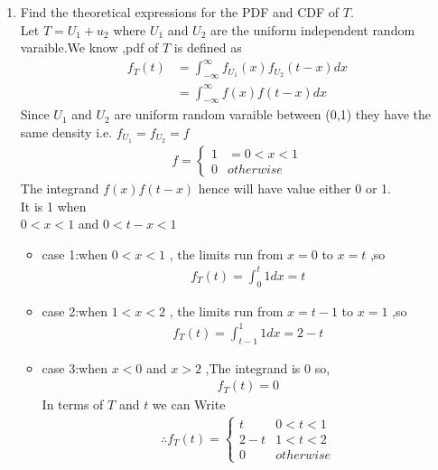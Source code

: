 \documentclass[journal,12pt,twocolumn]{IEEEtran}
\renewcommand\thesection{\arabic{section}}
\begin{document}
\begin{enumerate}[label=\thesection.\arabic*
,ref=\thesection.\theenumi]
\begin{figure}[h]
    \centering
    \texttt{[image: T\_Pdf.png]}
    \caption{The PDF of $T$}
    \label{fig:T_Pdf}
\end{figure}
\item Find the theoretical expressions for the PDF and CDF of $T$.\\
\solution Let $T = U_1 + u_2$ where $U_1$ and $U_2$ are the uniform independent random varaible.We know ,pdf of $T$ is defined as 
\begin{align}
    f_T(t) &= \int_{-\infty}^{\infty}f_{U_1}(x)f_{U_2}(t-x)dx\\
    &=\int_{-\infty}^{\infty}f(x)f(t-x)dx
\end{align}
Since $U_1$ and $U_2$ are uniform random varaible between (0,1) they have the same density
i.e. $f_{U_1} = f_{U_2} = f$
\begin{align}
    f = \begin{cases}
        1 &= 0<x<1 \\
        0 & otherwise
    \end{cases}
\end{align}
The integrand $f(x)f(t-x)$ hence will have value either 0 or 1. \\
It is 1 when \\
$0<x<1$ and $0<t-x<1$ 
\begin{itemize}
    \item case 1:when $0<x<1$ , the limits run from $x=0$ to $x=t$ ,so
    \begin{align}
        f_T(t)=\int_0^t 1dx = t
    \end{align}
    \item case 2:when $1<x<2$ , the limits run from $x=t-1$ to $x=1$ ,so
    \begin{align}
        f_T(t)=\int_{t-1}^1 1dx = 2-t
    \end{align}
    \item case 3:when $x<0$ and $x>2$ ,The integrand is 0 so, 
    \begin{align}
        f_T(t)=0
    \end{align}
In terms of $T$ and $t$ we can Write
\begin{align}\label{pdf}
    \therefore f_T(t)=\begin{cases}
        t &0<t<1 \\
        2-t &1<t<2 \\
        0 &otherwise
    \end{cases}
\end{align}

\end{itemize}
\end{enumerate}
\end{document}

